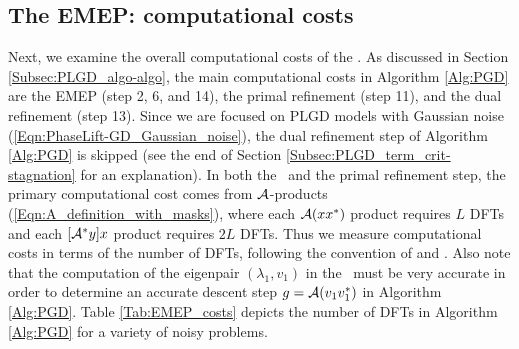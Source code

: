 \subsection{The EMEP: computational costs} 	\label{Subsubsec:evol_mats-EMEP_compu_costs}


Next, we examine the overall computational costs of the \emep.
As discussed in Section \ref{Subsec:PLGD_algo-algo}, the main computational costs in Algorithm \ref{Alg:PGD} are the EMEP (step 2, 6, and 14), the primal refinement (step 11), and the dual refinement (step 13).  
Since we are focused on PLGD models with Gaussian noise (\ref{Eqn:PhaseLift-GD_Gaussian_noise}), the dual refinement step of Algorithm \ref{Alg:PGD} is skipped (see the end of Section \ref{Subsec:PLGD_term_crit-stagnation} for an explanation).
In both the \emep \ and the primal refinement step, the primary computational cost comes from ${\mathcal A}$-products (\ref{Eqn:A_definition_with_masks}), where each ${\mathcal A}(xx^*)$ product requires $L$ DFTs and each $[{\mathcal A}^*y]x$ product requires $2L$ DFTs.  
Thus we measure computational costs in terms of the number of DFTs, following the convention of \cite{DBLP:journals/tit/CandesLS15} and \cite{DBLP:journals/siamsc/FriedlanderM16}.
Also note that the computation of the eigenpair $(\lambda_1, v_1)$ in the \emep \ must be very accurate in order to determine an accurate descent step $g = {\mathcal A}(v_1v_1^*)$ in Algorithm \ref{Alg:PGD}.
Table \ref{Tab:EMEP_costs} depicts the number of DFTs in Algorithm \ref{Alg:PGD} for a variety of noisy problems.
